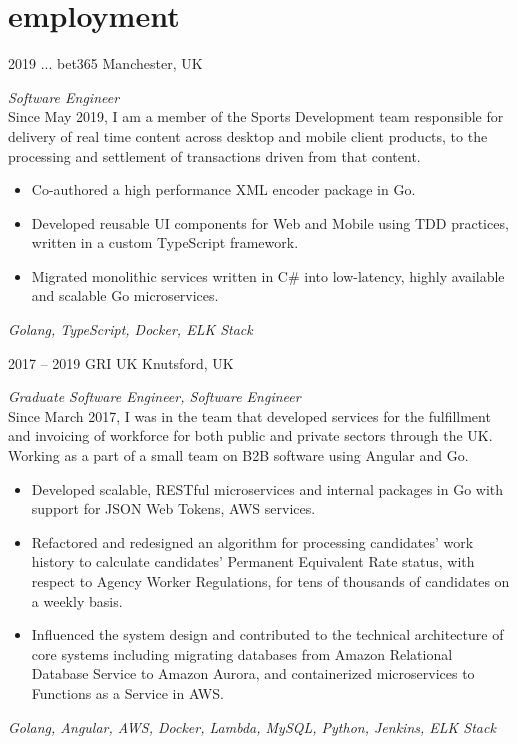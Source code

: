 \documentclass[]{friggeri-cv-a4} %
\begin{document}
\section{employment}
\begin{entrylist}

\entry
{2019 ...}
{bet365}
{Manchester, UK}
{\emph{Software Engineer} \\
Since May 2019, I am a member of the Sports Development team responsible for delivery of real time content across desktop and mobile client products, to the processing and settlement of transactions driven from that content.
\begin{itemize}
\item Co-authored a high performance XML encoder package in Go.
\item Developed reusable UI components for Web and Mobile using TDD practices, written in a custom TypeScript framework.
\item Migrated monolithic services written in C\# into low-latency, highly available and scalable Go microservices.
\end{itemize}
\small{\textit{Golang, TypeScript, Docker, ELK Stack}}
}

\entry
{2017 -- 2019}
{GRI UK}
{Knutsford, UK}
{\emph{Graduate Software Engineer, Software Engineer} \\
Since March 2017, I was in the team that developed services for the fulfillment and invoicing of workforce for both public and private sectors through the UK. Working as a part of
a small team on B2B software using Angular and Go.
\begin{itemize}
\item Developed scalable, RESTful microservices and internal packages in Go with support for JSON Web Tokens, AWS services.
\item Refactored and redesigned an algorithm for processing candidates' work history to calculate candidates' Permanent Equivalent Rate status, with respect to Agency Worker Regulations, for tens of thousands of
candidates on a weekly basis.
\item Influenced the system design and contributed to the technical architecture of core systems including migrating databases from Amazon Relational Database Service to Amazon Aurora, and containerized microservices to Functions as a Service in AWS.
\end{itemize}
\small{\textit{Golang, Angular, AWS, Docker, Lambda, MySQL, Python, Jenkins, ELK Stack}}
}

\end{entrylist}
\end{document}
